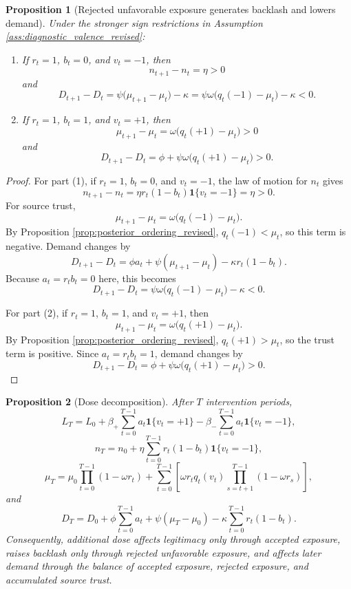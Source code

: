 \documentclass[12pt,american]{article}
\newtheorem{proposition}{Proposition}
\begin{document}
\begin{refsection}
		\begin{proposition}[Rejected unfavorable exposure generates backlash and lowers demand]
			\label{prop:backlash_demand_revised}
			Under the stronger sign restrictions in Assumption \ref{ass:diagnostic_valence_revised}:
			
			\begin{enumerate}
				\item If \(r_t=1\), \(b_t=0\), and \(v_t=-1\), then
				\[
				n_{t+1}-n_t=\eta>0
				\]
				and
				\[
				D_{t+1}-D_t
				=
				\psi\big(\mu_{t+1}-\mu_t\big)-\kappa
				=
				\psi\omega\big(q_t(-1)-\mu_t\big)-\kappa<0.
				\]
				
				\item If \(r_t=1\), \(b_t=1\), and \(v_t=+1\), then
				\[
				\mu_{t+1}-\mu_t=\omega\big(q_t(+1)-\mu_t\big)>0
				\]
				and
				\[
				D_{t+1}-D_t
				=
				\phi+\psi\omega\big(q_t(+1)-\mu_t\big)>0.
				\]
			\end{enumerate}
		\end{proposition}
		
		\begin{proof}
			For part (1), if \(r_t=1\), \(b_t=0\), and \(v_t=-1\), the law of motion for \(n_t\) gives
			\[
			n_{t+1}-n_t=\eta r_t(1-b_t)\mathbf{1}\{v_t=-1\}=\eta>0.
			\]
			For source trust,
			\[
			\mu_{t+1}-\mu_t
			=
			\omega\big(q_t(-1)-\mu_t\big).
			\]
			By Proposition \ref{prop:posterior_ordering_revised}, \(q_t(-1)<\mu_t\), so this term is negative. Demand changes by
			\[
			D_{t+1}-D_t
			=
			\phi a_t+\psi(\mu_{t+1}-\mu_t)-\kappa r_t(1-b_t).
			\]
			Because \(a_t=r_tb_t=0\) here, this becomes
			\[
			D_{t+1}-D_t=\psi\omega\big(q_t(-1)-\mu_t\big)-\kappa<0.
			\]
			
			For part (2), if \(r_t=1\), \(b_t=1\), and \(v_t=+1\), then
			\[
			\mu_{t+1}-\mu_t=\omega\big(q_t(+1)-\mu_t\big).
			\]
			By Proposition \ref{prop:posterior_ordering_revised}, \(q_t(+1)>\mu_t\), so the trust term is positive. Since \(a_t=r_tb_t=1\), demand changes by
			\[
			D_{t+1}-D_t
			=
			\phi+\psi\omega\big(q_t(+1)-\mu_t\big)>0.
			\]
		\end{proof}
		
		\begin{proposition}[Dose decomposition]
			\label{prop:dose_decomposition_revised}
			After \(T\) intervention periods,
			\[
			L_T
			=
			L_0
			+
			\beta_+ \sum_{t=0}^{T-1} a_t\mathbf{1}\{v_t=+1\}
			-
			\beta_- \sum_{t=0}^{T-1} a_t\mathbf{1}\{v_t=-1\},
			\]
			\[
			n_T
			=
			n_0
			+
			\eta \sum_{t=0}^{T-1} r_t(1-b_t)\mathbf{1}\{v_t=-1\},
			\]
			\[
			\mu_T
			=
			\mu_0\prod_{t=0}^{T-1}(1-\omega r_t)
			+
			\sum_{t=0}^{T-1}
			\left[
			\omega r_t q_t(v_t)\prod_{s=t+1}^{T-1}(1-\omega r_s)
			\right],
			\]
			and
			\[
			D_T
			=
			D_0
			+
			\phi \sum_{t=0}^{T-1} a_t
			+
			\psi(\mu_T-\mu_0)
			-
			\kappa \sum_{t=0}^{T-1} r_t(1-b_t).
			\]
			Consequently, additional dose affects legitimacy only through accepted exposure, raises backlash only through rejected unfavorable exposure, and affects later demand through the balance of accepted exposure, rejected exposure, and accumulated source trust.
		\end{proposition}
		

\end{refsection}
\end{document}
